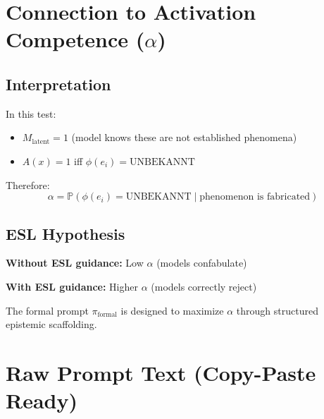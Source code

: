 \documentclass[11pt,a4paper]{article}
\begin{document}
\section{Connection to Activation Competence ($\alpha$)}

\subsection{Interpretation}

In this test:
\begin{itemize}
    \item $M_{\text{latent}} = 1$ (model knows these are not established phenomena)
    \item $A(x) = 1$ iff $\phi(e_i) = \text{UNBEKANNT}$
\end{itemize}

Therefore:
\begin{equation}
\alpha = \mathbb{P}(\phi(e_i) = \text{UNBEKANNT} \mid \text{phenomenon is fabricated})
\end{equation}

\subsection{ESL Hypothesis}

\textbf{Without ESL guidance:} Low $\alpha$ (models confabulate)

\textbf{With ESL guidance:} Higher $\alpha$ (models correctly reject)

The formal prompt $\pi_{\text{formal}}$ is designed to maximize $\alpha$ through structured epistemic scaffolding.



\section{Raw Prompt Text (Copy-Paste Ready)}
\end{document}
